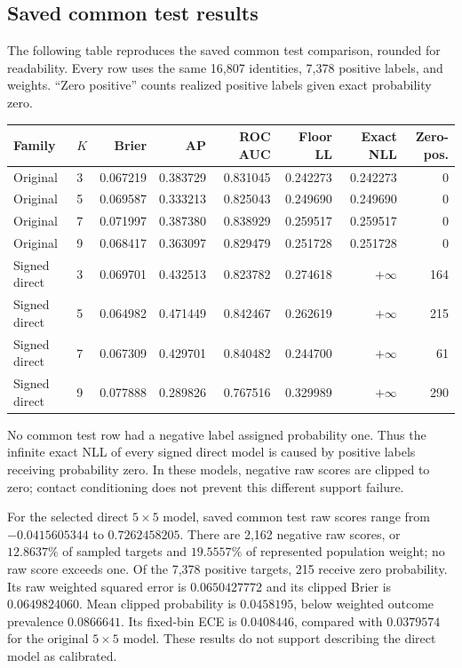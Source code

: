 \documentclass[11pt,a4paper]{article}
\begin{document}
\subsection{Saved common test results}

The following table reproduces the saved common test comparison, rounded for
readability. Every row uses the same 16,807 identities, 7,378 positive labels,
and weights. ``Zero positive'' counts realized positive labels given exact
probability zero.
\begin{center}
\begingroup
\small
\setlength{\tabcolsep}{3pt}
\begin{tabular}{llrrrrrr}
\hline
Family & $K$ & Brier & AP & ROC AUC & Floor LL & Exact NLL & Zero-pos.\\
\hline
Original & 3 & 0.067219 & 0.383729 & 0.831045 & 0.242273 & 0.242273 & 0\\
Original & 5 & 0.069587 & 0.333213 & 0.825043 & 0.249690 & 0.249690 & 0\\
Original & 7 & 0.071997 & 0.387380 & 0.838929 & 0.259517 & 0.259517 & 0\\
Original & 9 & 0.068417 & 0.363097 & 0.829479 & 0.251728 & 0.251728 & 0\\
Signed direct & 3 & 0.069701 & 0.432513 & 0.823782 & 0.274618 & $+\infty$ & 164\\
Signed direct & 5 & 0.064982 & 0.471449 & 0.842467 & 0.262619 & $+\infty$ & 215\\
Signed direct & 7 & 0.067309 & 0.429701 & 0.840482 & 0.244700 & $+\infty$ & 61\\
Signed direct & 9 & 0.077888 & 0.289826 & 0.767516 & 0.329989 & $+\infty$ & 290\\
\hline
\end{tabular}
\endgroup
\end{center}
No common test row had a negative label assigned probability one. Thus the
infinite exact NLL of every signed direct model is caused by positive labels
receiving probability zero. In these models, negative raw scores are clipped
to zero; contact conditioning does not prevent this different support failure.

For the selected direct $5\times5$ model, saved common test raw scores range
from $-0.0415605344$ to $0.7262458205$. There are 2,162 negative raw scores,
or $12.8637\%$ of sampled targets and $19.5557\%$ of represented population
weight; no raw score exceeds one. Of the 7,378 positive targets, 215 receive
zero probability. Its raw weighted squared error is $0.0650427772$ and its
clipped Brier is $0.0649824060$. Mean clipped probability is $0.0458195$,
below weighted outcome prevalence $0.0866641$. Its fixed-bin ECE is
$0.0408446$, compared with $0.0379574$ for the original $5\times5$ model.
These results do not support describing the direct model as calibrated.
\end{document}

